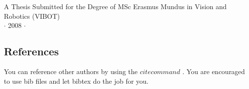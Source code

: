 \vspace{2cm}
\begin{center}
{\large A Thesis Submitted for the Degree of MSc Erasmus Mundus in
Vision and Robotics (VIBOT)\\ \vspace{0.3cm} $\cdot$ 2008 $\cdot$}
\end{center}


\subsection{References}
You can reference other authors by using the $cite command$
\cite{Pokorski:1998hr}. You are encouraged to use bib files and
let bibtex do the job for you.